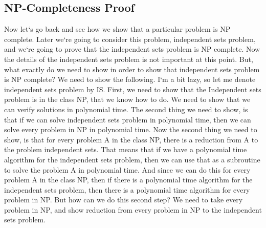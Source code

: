 \subsection{NP-Completeness Proof}
Now let`s go back and see how we show that a particular problem is NP complete.
Later we`re going to consider this problem, independent sets problem, and we`re going to prove that the independent sets problem is NP complete.
Now the details of the independent sets problem is not important at this point.
But, what exactly do we need to show in order to show that independent sets problem is NP complete? We need to show the following.
I`m a bit lazy, so let me denote independent sets problem by IS\@.
First, we need to show that the Independent sets problem is in the class NP, that we know how to do.
We need to show that we can verify solutions in polynomial time.
The second thing we need to show, is that if we can solve independent sets problem in polynomial time, then we can solve every problem in NP in polynomial time.
Now the second thing we need to show, is that for every problem A in the class NP, there is a reduction from A to the problem independent sets.
That means that if we have a polynomial time algorithm for the independent sets problem, then we can use that as a subroutine to solve the problem A in polynomial time.
And since we can do this for every problem A in the class NP, then if there is a polynomial time algorithm for the independent sets problem, then there is a polynomial time algorithm for every problem in NP\@.
But how can we do this second step? We need to take every problem in NP, and show reduction from every problem in NP to the independent sets problem.


